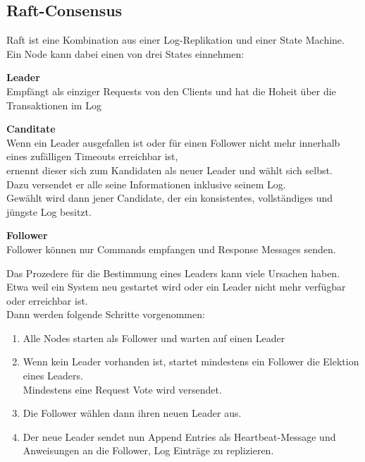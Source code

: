 
\begin{flushleft}
    \subsection{Raft-Consensus}
    \label{subsec:mraft_consensus}
    Raft ist eine Kombination aus einer Log-Replikation und einer \Gls{State Machine}\cite{529SHBCA}.\\
    Ein Node kann dabei einen von drei States einnehmen:\\
    \begin{description}
        \item \textbf{Leader}\hfill \\Empfängt als einziger Requests von den Clients und hat die Hoheit über die Transaktionen im Log
        \item \textbf{Canditate}\hfill \\Wenn ein Leader ausgefallen ist oder für einen Follower nicht mehr innerhalb eines zufälligen Timeouts erreichbar ist,\\ernennt dieser sich zum Kandidaten als neuer Leader und wählt sich selbst.\\Dazu versendet er alle seine Informationen inklusive seinem Log.\\Gewählt wird dann jener Candidate, der ein konsistentes, vollständiges und jüngste Log besitzt.
        \item \textbf{Follower}\hfill \\Follower können nur Commands empfangen und Response Messages senden.
    \end{description}
\end{flushleft}
\begin{flushleft}
    Das Prozedere für die Bestimmung eines Leaders kann viele Ursachen haben.\\
    Etwa weil ein System neu gestartet wird oder ein Leader nicht mehr verfügbar oder erreichbar ist.\\
    Dann werden folgende Schritte vorgenommen:
    \begin{enumerate}
        \item Alle Nodes starten als Follower und warten auf einen Leader
        \item Wenn kein Leader vorhanden ist, startet mindestens ein Follower die Elektion eines Leaders.\\Mindestens eine Request Vote wird versendet.
        \item Die Follower wählen dann ihren neuen Leader aus.
        \item Der neue Leader sendet nun Append Entries als Heartbeat-Message und Anweisungen an die Follower, Log Einträge zu replizieren.
    \end{enumerate}
\end{flushleft}

